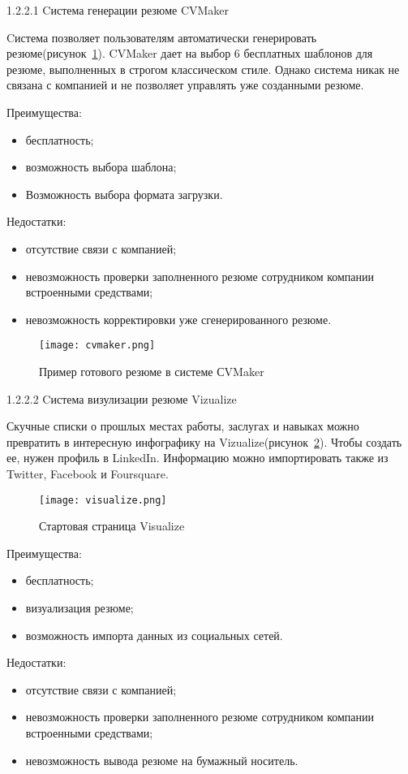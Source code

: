 1.2.2.1 Cистема генерации резюме CVMaker

Cистема позволяет пользователям автоматически генерировать резюме(рисунок~\ref{fig:analysis:analogues:cvmaker}).
CVMaker дает на выбор 6 бесплатных шаблонов для резюме, выполненных в строгом классическом стиле. Однако система никак
не связана с компанией и не позволяет управлять уже созданными резюме.

Преимущества:
\begin{itemize}
	\item бесплатность;
	\item возможность выбора шаблона;
	\item Возможность выбора формата загрузки.
\end{itemize}

Недостатки:
\begin{itemize}
	\item отсутствие связи с компанией;
	\item невозможность проверки заполненного резюме сотрудником компании встроенными средствами;
	\item невозможность корректировки уже сгенерированного резюме.
\end{itemize}

\begin{figure}[!t]
	\centering
	\texttt{[image: cvmaker.png]} 
	\caption{Пример готового резюме в системе СVMaker}
	\label{fig:analysis:analogues:cvmaker}
\end{figure}

1.2.2.2 Cистема визулизации резюме Vizualize

Скучные списки о прошлых местах работы, заслугах и навыках можно превратить в интересную инфографику на
Vizualize(рисунок~\ref{fig:analysis:analogues:visualize}). Чтобы создать ее, нужен профиль в LinkedIn. Информацию можно
импортировать также из Twitter, Facebook и Foursquare.

\begin{figure}[!t]
	\centering
	\texttt{[image: visualize.png]} 
	\caption{Стартовая страница Visualize}
	\label{fig:analysis:analogues:visualize}
\end{figure}

Преимущества:
\begin{itemize}
	\item бесплатность;
	\item визуализация резюме;
	\item возможность импорта данных из социальных сетей.
\end{itemize}

Недостатки:
\begin{itemize}
	\item отсутствие связи с компанией;
	\item невозможность проверки заполненного резюме сотрудником компании встроенными средствами;
	\item невозможность вывода резюме на бумажный носитель.
\end{itemize}
